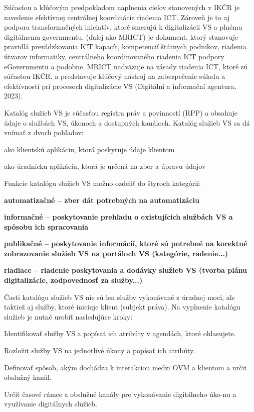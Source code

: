 Súčasťou a kľúčovým predpokladom naplnenia cieľov stanovených v IKČR je zavedenie efektívnej centrálnej koordinácie riadenia ICT. Zároveň je to aj podpora transformačných iniciatív, ktoré smerujú k digitalizácii VS a plnému digitálnemu governmentu.  (ďalej ako MRICT) je dokument, ktorý stanovuje pravidlá prevádzkovania ICT kapacít, kompetencií štátnych podnikov, riadenia útvarov informatiky, centrálneho koordinovaného riadenia ICT podpory eGovernmentu a podobne. MRICT nadväzuje na zásady riadenia ICT, ktoré sú súčasťou IKČR, a predstavuje kľúčový nástroj na zabezpečenie súladu a efektívnosti pri procesoch digitalizácie VS \scr(Digitální a informační agentura, 2023).

Katalóg služieb VS je súčasťou registra práv a povinností (RPP) a obsahuje údaje o službách VS, úkonoch a dostupných kanáloch. Katalóg služieb VS sa dá vnímať z dvoch pohľadov:

\startitemize[a]
\item{ako klientskú aplikáciu, ktorá poskytuje údaje klientom}
\item{ako úradnícku aplikáciu, ktorá je určená na zber a úpravu údajov}
\stopitemize

Funkcie katalógu služieb VS možno ozdeliť do štyroch kategórií:

\startitemize
\item{\start \bf automatizačné \stop – zber dát potrebných na automatizáciu}
\item{\start \bf informačné \stop – poskytovanie prehľadu o existujícich službách VS a spôsobu ich spracovania}
\item{\start \bf publikačné \stop – poskytovanie informácií, ktoré sú potrebné na korektné zobrazovanie služieb VS na portáloch VS (kategórie, radenie...)}
\item{\start \bf riadiace \stop – riadenie poskytovania a dodávky služieb VS (tvorba plánu digitalizácie, zodpovednosť za služby...)}
\stopitemize

Časti katalógu služieb VS nie sú len služby vykonávané z úradnej moci, ale taktiež aj služby, ktoré iniciuje klient (subjekt práva). Na vyplnenie katalógu služieb je nutné urobiť nasledujúce kroky:

\startitemize[n]
\item{Identifikovať služby VS a popísať ich atribúty v agendách, ktoré ohlasujete.}
\item{Rozložit služby VS na jednotlivé úkony a popísať ich atribúty.}
\item{Definovať spôsob, akým dochádza k interakciou medzi OVM a klientom a určit obslužný kanál.}
\item{Určiť časové rámce a obslužné kanály pre vykonávanie digitálneho úko-nu a využívanie digitálnych služieb.}
\stopitemize

